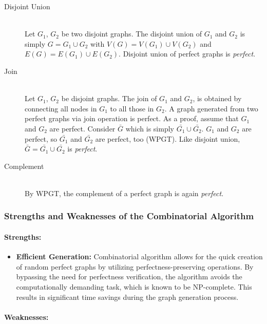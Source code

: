 \begin{description}
    \item[Disjoint Union] \hfill \\
    Let $G_1$, $G_2$ be two disjoint graphs. The disjoint union of $G_1$ and $G_2$ is simply $G = G_1 \cup G_2$ with $V(G) = V(G_1) \cup V(G_2)$ and $E(G) = E(G_1) \cup E(G_2)$. Disjoint union of perfect graphs is \textit{perfect}.

    \item[Join] \hfill \\
    Let $G_1$, $G_2$ be disjoint graphs. The join of $G_1$ and $G_2$, is obtained by connecting all nodes in $G_1$ to all those in $G_2$. A graph generated from two perfect graphs via join operation is perfect. As a proof, assume that $G_1$ and $G_2$ are perfect. Consider $\bar{G}$ which is simply $\bar{G_1} \cup \bar{G_2}$. $G_1$ and $G_2$ are perfect, so $\bar{G_1}$ and $\bar{G_2}$ are perfect, too (WPGT). Like disjoint union, $\bar{G} = \bar{G_1} \cup \bar{G_2}$ is \textit{perfect}.

    \item[Complement] \hfill \\
    By WPGT, the complement of a perfect graph is again \textit{perfect}.

\end{description}

\subsubsection{Strengths and Weaknesses of the Combinatorial Algorithm}
\paragraph{Strengths:}

\begin{itemize}
\item \textbf{Efficient Generation:} Combinatorial algorithm allows for the quick creation of random perfect graphs by utilizing perfectness-preserving operations. By bypassing the need for perfectness verification, the algorithm avoids the computationally demanding task, which is known to be NP-complete. This results in significant time savings during the graph generation process.
\end{itemize}
\paragraph{Weaknesses:}

